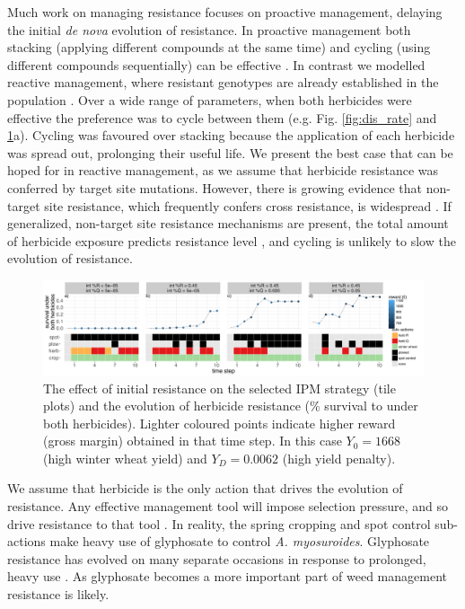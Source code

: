 \documentclass[12pt, a4paper]{article}
\begin{document}
Much work on managing resistance focuses on proactive management, delaying the initial \textit{de nova} evolution of resistance. In proactive management both stacking (applying different compounds at the same time) and cycling (using different compounds sequentially) can be effective \citep{REX2013}. In contrast we modelled reactive management, where resistant genotypes are already established in the population \citep{Hick2018}. Over a wide range of parameters, when both herbicides were effective the preference was to cycle between them (e.g. Fig. \ref{fig:dis_rate} and \ref{fig:int_res}a). Cycling was favoured over stacking because the application of each herbicide was spread out, prolonging their useful life. We present the best case that can be hoped for in reactive management, as we assume that herbicide resistance was conferred by target site mutations. However, there is growing evidence that non-target site resistance, which frequently confers cross resistance, is widespread \citep{Hick2018}. If generalized, non-target site resistance mechanisms are present, the total amount of herbicide exposure predicts resistance level \citep{Hick2018}, and cycling is unlikely to slow the evolution of resistance. 
\begin{figure}[!ht]
	\includegraphics[width=178mm]{MS_figs/int_res_strat_resist.pdf}
	\caption{The effect of initial resistance on the selected IPM strategy (tile plots) and the evolution of herbicide resistance (\% survival to under both herbicides). Lighter coloured points indicate higher reward (gross margin) obtained in that time step. In this case $Y_0 = 1668$ (high winter wheat yield) and $Y_D = 0.0062$ (high yield penalty).}
	\label{fig:int_res} 
\end{figure}

We assume that herbicide is the only action that drives the evolution of resistance. Any effective management tool will impose selection pressure, and so drive resistance to that tool \citep{Jord1997}. In reality, the spring cropping and spot control sub-actions make heavy use of glyphosate to control \textit{A. myosuroides}. Glyphosate resistance has evolved on many separate occasions in response to prolonged, heavy use \citep{Samm2014}. As glyphosate becomes a more important part of weed management \citep{Hick2018} resistance is likely. 
\end{document}
